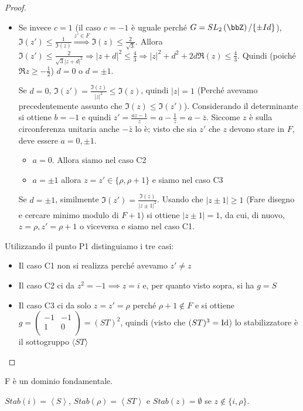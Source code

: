 \begin{proof}
\begin{itemize}
\item Se invece $c=1$ (il caso $c=-1$ è uguale perché
  $G=SL_2 \left( \bbZ \right)/\{\pm Id\}$),
  $\Im(z') \leq \frac{1}{\Im(z)} \stackrel{z' \in F}{\Rightarrow} \Im(z) \leq \frac{2}{\sqrt{3}}$.
  Allora $\Im(z') \leq \frac{2}{\sqrt{3}|z+d|^2} \Rightarrow
  |z+d|^2 \leq \frac{4}{3} \Rightarrow |z|^2+d^2+2d \Re(z) \leq \frac{4}{3}$.
  Quindi (poiché $\Re z \ge -\frac{1}{2}$) $d=0$ o $d=\pm 1$.

  Se $d=0$, $\Im(z') = \frac{\Im(z)}{|z|^2} \leq \Im(z)$, quindi $|z|=1$ (Perché avevamo precedentemente assunto che $\Im(z) \le \Im(z')$).
  Considerando il determinante si ottiene $b = -1$ e quindi $z' = \frac{az - 1}{z} = a - \frac{1}{z} = a - \bar{z}$. Siccome $z$ è sulla circonferenza unitaria anche $- \bar{z}$ lo è; visto che sia $z'$ che $z$ devono stare in $F$, deve essere $a = 0, \pm 1$.
  \begin{itemize}
  \item $a = 0$. Allora siamo nel caso C2
  \item $a = \pm 1$ allora $z = z' \in \{\rho, \rho + 1\}$ e siamo nel caso C3
  \end{itemize}

  Se $d=\pm 1$, similmente $\Im(z') = \frac{\Im(z)}{|z \pm 1|^2}$. Usando che $|z \pm 1| \ge 1$ (Fare disegno e cercare minimo modulo di $F + 1$)
  si ottiene $|z \pm 1|=1$, da cui, di nuovo, $z=\rho, z'=\rho + 1$ o viceversa e siamo nel caso C1.
\end{itemize}

\bigskip
{} Utilizzando il punto P1 distinguiamo i tre casi:
\begin{itemize}
\item Il caso C1 non si realizza perché avevamo $z' \neq z$
\item Il caso C2 ci da $z^2 = -1 \implies z = i$ e, per quanto visto sopra, si ha $g = S$
\item Il caso C3 ci da solo $z = z' = \rho$ perché $\rho + 1 \notin F$ e si ottiene $g = \left(\begin{array}{cc} -1 & -1 \\ 1 & 0 \\ \end{array} \right) = (ST)^2$, quindi (visto che $(ST)^3 = \text{Id}$) lo stabilizzatore è il sottogruppo $\langle ST \rangle$
\end{itemize}
\end{proof}

\begin{corollario}
F è un dominio fondamentale.

$Stab(i)=\left\langle S \right\rangle$,
$Stab(\rho)=\left\langle ST \right\rangle$ e $Stab(z)=\emptyset$ se
$z \notin \{i, \rho \}$.
\end{corollario}

